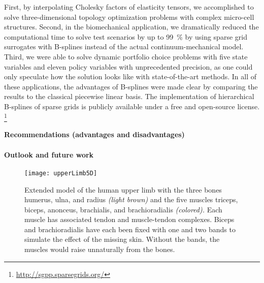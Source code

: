 First, by interpolating Cholesky factors of elasticity tensors,
we accomplished to solve three-dimensional topology optimization problems
with complex micro-cell structures.
Second, in the biomechanical application,
we dramatically reduced the computational time to solve
test scenarios by up to \SI{99}{\percent} by using
sparse grid surrogates with B-splines instead of the
actual continuum-mechanical model.
Third, we were able to solve dynamic portfolio choice problems
with five state variables and eleven policy variables
with unprecedented precision, as one could only speculate
how the solution looks like with state-of-the-art methods.
In all of these applications, the advantages of B-splines were made clear
by comparing the results to the classical piecewise linear basis.
The implementation of hierarchical B-splines of sparse grids is
publicly available under a free and open-source license.%
\footnote{%
  \url{http://sgpp.sparsegrids.org/}%
}

\paragraph{Recommendations (advantages and disadvantages)}


\dummytext[1]{}

\paragraph{Outlook and future work}

\begin{SCfigure}
  \texttt{[image: upperLimb5D]}%
  \caption[Extended model of the human upper limb with five muscles]{%
    Extended model of the human upper limb with
    the three bones humerus, ulna, and radius \emph{(light brown)} and
    the five muscles
    triceps, biceps, anonceus, brachialis, and brachioradialis
    \emph{(colored).}
    Each muscle has associated tendon and muscle-tendon complexes.
    Biceps and brachioradialis have each been fixed with one and two bands
    to simulate the effect of the missing skin.
    Without the bands, the muscles would raise unnaturally from the bones.%
  }%
  \label{fig:upperLimb5D}%
\end{SCfigure}


